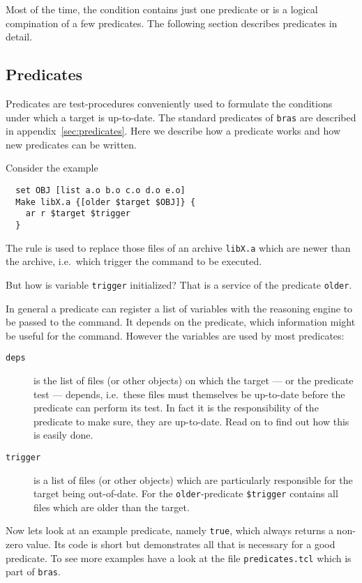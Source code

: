 \documentclass[11pt]{scrartcl}
\newcommand{\bras}{\texttt{bras}}
\begin{document}
Most of the time, the condition contains just one predicate or is a
logical compination of a few predicates. The following section
describes predicates in detail.

\subsection{Predicates}

Predicates are test-procedures conveniently used to formulate the
conditions under which a target is up-to-date. The standard predicates
of \bras{} are described in appendix~\ref{sec:predicates}.  Here we
describe how a predicate works and how new predicates can be written.

Consider the example
\begin{verbatim}
  set OBJ [list a.o b.o c.o d.o e.o]
  Make libX.a {[older $target $OBJ]} {
    ar r $target $trigger
  }
\end{verbatim}
The rule is used to replace those files of an archive \texttt{libX.a}
which are newer than the archive, i.e.\ which trigger the command to
be executed. 

But how is variable \texttt{trigger} initialized? That is a service of
the predicate \texttt{older}.

In general a predicate can register a list of variables with the
reasoning engine to be passed to the command. It depends on the
predicate, which information might be useful for the command. However
the variables are used by most predicates:
\begin{description}
\item[\texttt{deps}] is the list of files (or other objects) on which
  the target --- or the predicate test --- depends, i.e.\ these files
  must themselves be up-to-date before the predicate can perform its
  test. In fact it is the responsibility of the predicate to make
  sure, they are up-to-date. Read on to find out how this is easily
  done. 
\item[\texttt{trigger}] is a list of files (or other objects) which
  are particularly responsible for the target being out-of-date. For
  the \texttt{older}-predicate \texttt{\$trigger} contains all files
  which are older than the target.
\end{description}

Now lets look at an example predicate, namely \texttt{true}, which
always returns a non-zero value. Its code is short but demonstrates
all that is necessary for a good predicate. To see more examples have
a look at the file \texttt{predicates.tcl} which is part of \bras.
\end{document}
